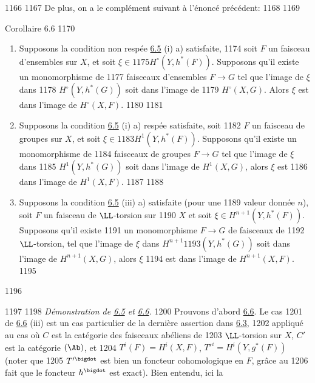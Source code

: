   1166	
  1167	De plus, on a le complément suivant à l'énoncé précédent:
  1168	
  1169	\begin{enonce*}{Corollaire 6.6}
  1170	\begin{enumerate}
  1171	\renewcommand{\theenumi}{\roman{enumi}}
  1172	\renewcommand{\labelenumi}{(\theenumi)}
  1173	\item Supposons la condition non respée \hyperref[XII.prop6.5]{6.5} {\rm (i) a)} satisfaite,
  1174	soit $F$ un faisceau d'ensembles sur $X$, et soit $\xi\in
  1175	H^{\circ}(Y,h^{\ast}(F))$. Supposons qu'il	existe un monomorphisme de
  1177	faisceaux d'ensembles $F\rightarrow G$ tel que l'image de $\xi$ dans
  1178	$H^{\circ}(Y,h^{\ast}(G))$ soit dans l'image de
  1179	$H^{\circ}(X,G)$. Alors $\xi$ est dans l'image de $H^{\circ}(X,F)$.
  1180	
  1181	\item Supposons la condition {\rm \hyperref[XII.prop6.5]{6.5} (i) a)} respée satisfaite, soit
  1182	$F$ un faisceau de groupes sur $X$, et soit $\xi\in
  1183	H^1(Y,h^{\ast}(F))$. Supposons qu'il existe un monomorphisme de
  1184	faisceaux de groupes $F\rightarrow G$ tel que l'image de $\xi$ dans
  1185	$H^1(Y,h^{\ast}(G))$ soit dans l'image de $H^1(X,G)$, alors $\xi$ est
  1186	dans l'image de $H^1(X,F)$.
  1187	
  1188	\item Supposons la condition {\rm \hyperref[XII.prop6.5]{6.5} (iii) a)} satisfaite (pour une
  1189	valeur donnée $n$), soit $F$ un faisceau de $\LL$-torsion sur
  1190	$X$ et soit $\xi\in H^{n+1}(Y,h^{\ast}(F))$. Supposons qu'il existe
  1191	un monomorphisme $F\rightarrow G$ de faisceaux de
  1192	$\LL$-torsion, tel que l'image de $\xi$ dans $H^{n+1}
  1193	(Y,h^{\ast}(G))$ soit dans l'image de $H^{n+1}(X,G)$, alors $\xi$
  1194	est dans l'image de $H^{n+1}(X,F)$.
  1195	\end{enumerate}
  1196	\end{enonce*}
  1197	
  1198		\emph{Démonstration de \hyperref[XII.prop6.5]{6.5} et \hyperref[XII.cor6.6]{6.6}.} 
  1200	Prouvons d'abord \hyperref[XII.cor6.6]{6.6}. Le cas
  1201	de \hyperref[XII.cor6.6]{6.6} (iii) est un cas particulier de la dernière assertion dans \hyperref[XII.cor6.3]{6.3},
  1202	appliqué au cas où $C$ est la catégorie des faisceaux abéliens de
  1203	$\LL$-torsion sur $X$, $C'$ est la catégorie $(\Ab)$, et
  1204	$T^{i}(F)=H^{i}(X,F)$, ${T'}^{i}=H^{i}(Y,g^{\ast}(F))$ (noter que
  1205	$T'^{\bigdot}$ est bien un foncteur cohomologique en $F$, grâce au
  1206	fait que le foncteur $h^{\bigdot}$ est exact). Bien entendu, ici la
